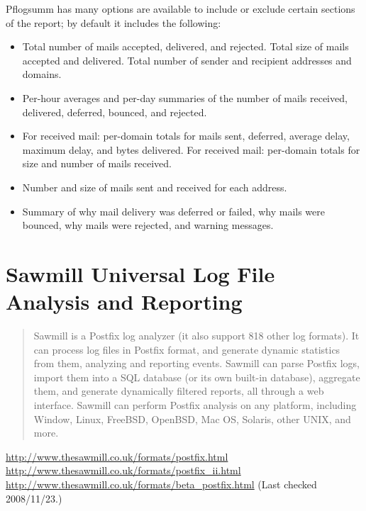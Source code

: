 Pflogsumm has many options are available to include or exclude certain
sections of the report; by default it includes the following:

\begin{itemize}

    \item Total number of mails accepted, delivered, and rejected.  Total
        size of mails accepted and delivered.  Total number of sender and
        recipient addresses and domains.

    \item Per-hour averages and per-day summaries of the number of mails
        received, delivered, deferred, bounced, and rejected.

    \item For received mail: per-domain totals for mails sent, deferred,
        average delay, maximum delay, and bytes delivered.  For received
        mail: per-domain totals for size and number of mails received.

    \item Number and size of mails sent and received for each address.

    \item Summary of why mail delivery was deferred or failed, why mails
        were bounced, why mails were rejected, and warning messages.

\end{itemize}

\section{Sawmill Universal Log File Analysis and Reporting}

\begin{quotation}

    Sawmill is a Postfix log analyzer (it also support 818 other log
    formats). It can process log files in Postfix format, and generate
    dynamic statistics from them, analyzing and reporting events. Sawmill
    can parse Postfix logs, import them into a SQL database (or its own
    built-in database), aggregate them, and generate dynamically filtered
    reports, all through a web interface. Sawmill can perform Postfix
    analysis on any platform, including Window, Linux, FreeBSD, OpenBSD,
    Mac OS, Solaris, other UNIX, and more.

\end{quotation}

\noindent{}\url{http://www.thesawmill.co.uk/formats/postfix.html}
\newline{} \url{http://www.thesawmill.co.uk/formats/postfix_ii.html}
\newline{} \url{http://www.thesawmill.co.uk/formats/beta_postfix.html}
\newline{} (Last checked 2008/11/23.)

